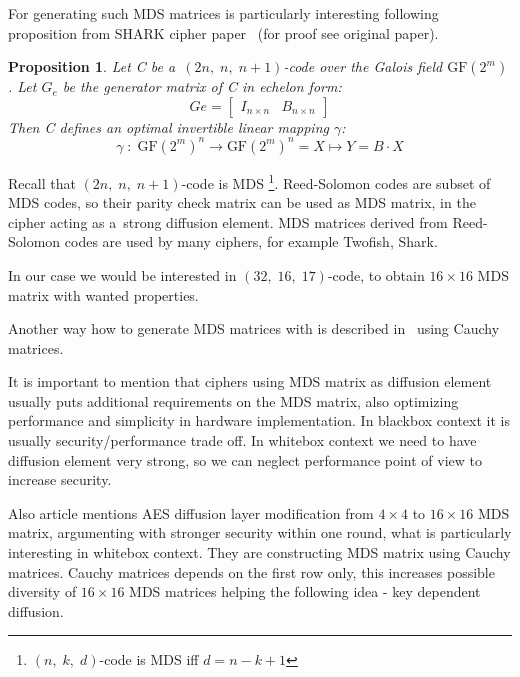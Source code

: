 \documentclass[11pt,oneside,final]{fithesis2}
\newtheorem{myprop}{Proposition}
\begin{document}
    For generating such MDS matrices is particularly interesting following proposition from SHARK cipher paper~\citep{shark96} (for proof see
    original paper).
    
    \begin{myprop}
	Let C be a~$(2n,\; n,\; n+1)$-code over the Galois field $\text{GF}(2^m)$. Let $G_e$  be the generator matrix of C in echelon form:
	\begin{equation}
	   Ge = \begin{bmatrix} I_{n \times n} & B_{n \times n}\end{bmatrix}
	\end{equation}
	Then C defines an optimal invertible linear mapping $\gamma$:
	\begin{equation}
	   \gamma \; : \; \text{GF}(2^m)^n \rightarrow \text{GF}(2^m)^n = X \mapsto Y = B \cdot X
	\end{equation}
    \end{myprop}
    
    Recall that $(2n,\; n,\; n+1)$-code is MDS \footnote{$(n,\;k,\;d)$-code is MDS iff $d=n-k+1$}. Reed-Solomon codes are subset of MDS codes, so their 
    parity check matrix can be used as MDS matrix, in the cipher acting as a~strong diffusion element. MDS matrices derived from Reed-Solomon codes are used by many 
    ciphers, for example Twofish, Shark. 

    In our case we would be interested in $(32,\;16,\;17)$-code, to obtain $16 \times 16$ MDS matrix with wanted properties.
    
    Another way how to generate MDS matrices with is described in~\citep{Roth:1985:GMM:7030.7044} using Cauchy matrices. 

    It is important to mention that ciphers using MDS matrix as diffusion element usually puts additional requirements on the MDS matrix, also optimizing
    performance and simplicity in hardware implementation. In blackbox context it is usually security/performance trade off. In whitebox context we need
    to have diffusion element very strong, so we can neglect performance point of view to increase security.
    
    Also article \cite{mds_aes} mentions AES diffusion layer modification from $4 \times 4$ to $16 \times 16$ MDS matrix, argumenting with 
    stronger security within one round, what is particularly interesting in whitebox context. They are constructing MDS matrix using Cauchy matrices. Cauchy matrices
    depends on the first row only, this increases possible diversity of $16 \times 16$ MDS matrices helping the following idea - key dependent diffusion.
\end{document}
